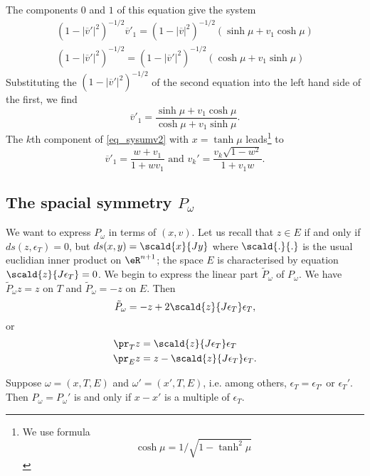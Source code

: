 The components $0$ and $1$ of this equation give the system
\begin{subequations}
	\begin{align}
		(1-|\overline{v}'|^2)^{-1/2}\overline{v}'_1=(1-|\overline{v}|^2)^{-1/2}(\sinh\mu+v_1\cosh\mu) \\
		(1-|\overline{v}'|^2)^{-1/2}=(1-|\overline{v}'|^2)^{-1/2}(\cosh\mu+v_1\sinh\mu)
	\end{align}
\end{subequations}
Substituting the $(1-|\overline{v}'|^2)^{-1/2}$ of the second equation into the left hand side of the first, we find
\[
	\overline{v}'_1=\frac{ \sinh\mu+v_1\cosh\mu }{ \cosh\mu+v_1\sinh\mu }.
\]
The $k$th component of \eqref{eq_sysumv2} with $x=\tanh\mu$ leads\footnote{We use formula
	\[\cosh\mu=1/\sqrt{1-\tanh^2\mu}\]} to
\[
	\overline{v}'_1=\frac{ w+v_1 }{ 1+wv_1 }\text{ and } v_k'=\frac{ v_k\sqrt{1-w^2} }{ 1+v_1w }.
\]


\subsection{The spacial symmetry \texorpdfstring{$P_{\omega}$}{P}}

We want to express $P_{\omega}$ in terms of $(x,v)$. Let us recall that $z\in E$ if and only if $ds(z,\epsilon_T)=0$, but $ds(x,y)=\scald{ x }{ Jy }$ where $\scald{ . }{ . }$ is the usual euclidian inner product on $\eR^{n+1}$; the space $E$ is characterised by equation $\scald{ z }{ J\epsilon_T }=0$. We begin to express the linear part $\tilde P_{\omega}$ of $P_{\omega}$. We have $\tilde P_{\omega}z=z$ on $T$ and $\tilde P_{\omega}=-z$ on $E$. Then
\begin{equation}
	\tilde P_{\omega}=-z+2\scald{ z }{ J\epsilon_T }\epsilon_T,
\end{equation}
or
\begin{subequations}
	\begin{align}
		\pr_Tz & =\scald{ z }{ J\epsilon_T }\epsilon_T    \\
		\pr_Ez & =z-\scald{ z }{ J\epsilon_T }\epsilon_T.
	\end{align}
\end{subequations}

\begin{lemma}
	Suppose $\omega=(x,T,E)$ and $\omega'=(x',T,E)$, i.e. among others, $\epsilon_T=\epsilon_{T'}$ or $\epsilon_{T}'$. Then $P_{\omega}=P_{\omega}'$ is and only if $x-x'$ is a multiple of $\epsilon_T$.
\end{lemma}

